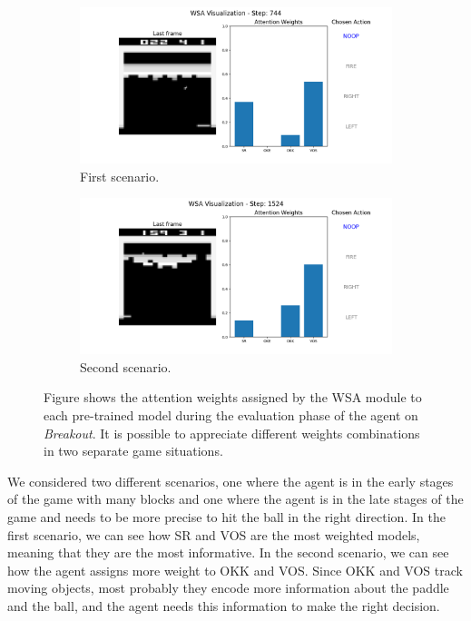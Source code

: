 \begin{figure}[ht]
    \centering
    \begin{subfigure}[b]{1\textwidth}
        \centering
        \includegraphics[width=\textwidth]{images/744}
        \caption{First scenario.}
        \label{fig:breakout_weights1}
    \end{subfigure}
    \hfill
    \begin{subfigure}[b]{1\textwidth}
        \centering
        \includegraphics[width=\textwidth]{images/1524}
        \caption{Second scenario.}
        \label{fig:breakout_weights2}
    \end{subfigure}
    \caption{Figure shows the attention weights assigned by the WSA module to each pre-trained model during the evaluation phase of the agent on \textit{Breakout}. It is possible to appreciate different weights combinations in two separate game situations.}
    \label{fig:breakout_attention}
\end{figure}

We considered two different scenarios, one where the agent is in the early stages of the game with many blocks and one where the agent is in the late stages of the game and needs to be more precise to hit the ball in the right direction.
In the first scenario, we can see how SR and VOS are the most weighted models, meaning that they are the most informative.
In the second scenario, we can see how the agent assigns more weight to OKK and VOS.
Since OKK and VOS track moving objects, most probably they encode more information about the paddle and the ball, and the agent needs this information to make the right decision.



